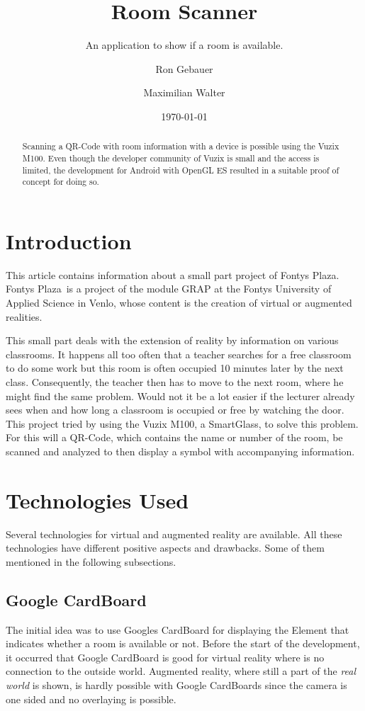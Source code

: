 \documentclass[11pt]{scrartcl}
\title{Room Scanner}
\subtitle{An application to show if a room is available.}
\author{Ron Gebauer \and Maximilian Walter}
\date{\today}
\begin{document}
\maketitle
\nocite{*}
\begin{abstract}
	Scanning a QR-Code with room information with a device is possible using the Vuzix M100. Even though the developer community of Vuzix is small and the access is limited, the development for Android with OpenGL ES resulted in a suitable proof of concept for doing so. 
\end{abstract}

\begin{multicols}{2}
	\section{Introduction}
	This article contains information about a small part project of \glqq Fontys Plaza\grqq. \glqq Fontys Plaza\grqq\ is a project of the module GRAP at the Fontys University of Applied Science in Venlo, whose content is the creation of virtual or augmented realities.
	
	This small part deals with the extension of reality by information on various classrooms. It happens all too often that a teacher searches for a free classroom to do some work but this room is often occupied 10 minutes later by the next class. Consequently, the teacher then has to move to the next room, where he might find the same problem. Would not it be a lot easier if the lecturer already sees when and how long a classroom is occupied or free by watching the door.
	This project tried by using the Vuzix M100, a SmartGlass, to solve this problem. For this will a QR-Code, which contains the name or number of the room, be scanned and analyzed to then display a symbol with accompanying information.
	
	\section{Technologies Used}
	Several technologies for virtual and augmented reality are available. All these technologies have different positive aspects and drawbacks. Some of them mentioned in the following subsections.
		\subsection{Google CardBoard}
			The initial idea was to use Googles CardBoard for displaying the Element that indicates whether a room is available or not. Before the start of the development, it occurred that Google CardBoard is good for virtual reality where is no connection to the outside world. Augmented reality, where still a part of the \emph{real world} is shown, is hardly possible with Google CardBoards since the camera is one sided and no overlaying is possible.
	

\end{multicols}
\end{document}
